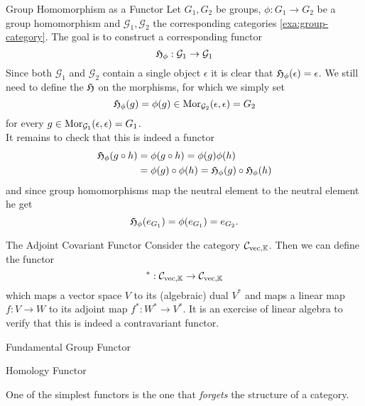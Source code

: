 \begin{example}{Group Homomorphism as a Functor}{}
Let $G_1, G_2$ be groups, $\phi: G_1 \to G_2$ be a group homomorphism and $\mathcal{G}_1,\mathcal{G}_2$ the corresponding categories \ref{exa:group-category}. The goal is to construct a corresponding functor 
$$
\mathfrak{H}_\phi: \mathcal{G}_1 \to \mathcal{G}_1
$$
Since both $\mathcal{G}_1$ and $\mathcal{G}_2$ contain a single object $\epsilon$ it is clear that $\mathfrak{H}_\phi(\epsilon) = \epsilon$. We still need to define the $\mathfrak{H}$ on the morphisms, for which we simply set
$$
\mathfrak{H}_\phi(g) = \phi(g) \in \mathrm {Mor}_{\mathcal{G}_2}(\epsilon, \epsilon) = G_2
$$
for every $g \in \mathrm {Mor}_{\mathcal{G}_1}(\epsilon, \epsilon) = G_1$. \\

It remains to check that this is indeed a functor
\begin{equation*}
\begin{split}
\mathfrak{H}_\phi(g \circ h) &= \phi(g \circ h) = \phi(g)\phi(h) \\
&= \phi(g) \circ \phi(h) = \mathfrak{H}_\phi(g) \circ \mathfrak{H}_\phi(h)
\end{split}
\end{equation*}
and since group homomorphisms map the neutral element to the neutral element he get
\begin{equation*}
\mathfrak{H}_\phi(e_{G_1}) = \phi(e_{G_1}) = e_{G_2}.
\end{equation*}
\end{example}

\begin{example}{The Adjoint Covariant Functor}{}
Consider the category $\mathcal{C}_{\mathrm{vec}, \mathbb{K}}$. Then we can define the functor
$$
^* : \mathcal{C}_{\mathrm{vec}, \mathbb{K}} \to \mathcal{C}_{\mathrm{vec}, \mathbb{K}}
$$
which maps a vector space $V$ to its (algebraic) dual $V^*$ and maps a linear map $f: V \to W$ to its adjoint map $f^*: W^* \to V^*$. It is an exercise of linear algebra to verify that this is indeed a contravariant functor.
\end{example}

\begin{example}{Fundamental Group Functor}{}
\cite{Hatcher2001}
\todo
\end{example}

\begin{example}{Homology Functor}{}
\cite{Hatcher2001}
\todo
\end{example}


One of the simplest functors is the one that \emph{forgets} the structure of a category.

